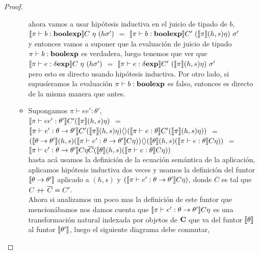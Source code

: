 \begin{proof}
\begin{itemize}
\begin{itemize}
ahora vamos a usar hip\'otesis inductiva en el juicio de tipado de $b$,\\

$\semBrcks{ \pi \vdash b : \boolexp}C \ \eta \ (h\sigma')$ $=$
$\semBrcks{ \pi \vdash b : \boolexp}C' \ (\semBrcks{\pi}(h,s)\eta) \ \sigma'$\\

y entonces vamos a suponer que la evaluaci\'on de juicio de tipado
$\pi \vdash b : \textbf{boolexp}$ es verdadera, luego tenemos que ver que\\

$\llbracket  \pi \vdash e : \delta \textbf{exp} \rrbracket C \ \eta \ (h\sigma')$ $=$ 
$\semBrcks{ \pi \vdash e : \deltaexp}C' \ (\semBrcks{\pi}(h,s)\eta) \ \sigma'$\\

pero esto es directo usando hip\'otesis inductiva. Por otro lado, si supus\'ieramos
la evaluaci\'on $\pi \vdash b : \textbf{boolexp}$ es falso, entonces es directo de la misma
manera que antes.

\item Supongamos $\pi \vdash ee' : \theta'$, \\

$\llbracket \pi \vdash ee' : \theta' \rrbracket C'(\llbracket \pi \rrbracket(h,s)\eta)$ $=$\\
$\llbracket \pi \vdash e' : \theta \rightarrow \theta' \rrbracket C'
		(\llbracket \pi \rrbracket(h,s)\eta)\langle  \rangle
		(\llbracket \pi \vdash e : \theta \rrbracket C'(\llbracket \pi \rrbracket(h,s)\eta))$ $=$\\
$(\llbracket \theta \rightarrow \theta' \rrbracket(h,s)
	(\llbracket \pi \vdash e' : \theta \rightarrow \theta' \rrbracket C \eta))\langle  \rangle
	(\llbracket \theta \rrbracket(h,s)(\llbracket \pi \vdash e : \theta \rrbracket C\eta))$ $=$\\
$\llbracket \pi \vdash e' : \theta \rightarrow \theta' \rrbracket C \eta \overline{C}
	(\llbracket \theta \rrbracket(h,s)(\llbracket \pi \vdash e : \theta \rrbracket C\eta))$\\

hasta ac\'a usamos la definici\'on de la ecuaci\'on sem\'antica de la aplicaci\'on,
aplicamos hip\'otesis inductiva dos veces y usamos la definici\'on del funtor
$\llbracket \theta \rightarrow \theta' \rrbracket$ aplicado a $(h,s)$ y 
$(\llbracket \pi \vdash e' : \theta \rightarrow \theta' \rrbracket C \eta)$, donde 
$\overline{C}$ es tal que $C +\kern-1.3ex+\kern0.8ex \overline{C} = C'$.\\
Ahora si analizamos un poco mas la definici\'on de este funtor que mencion\'abamos
nos damos cuenta que $\llbracket \pi \vdash e' : \theta \rightarrow \theta' \rrbracket C \eta$
es una transformaci\'on natural indexada por objetos de $\textbf{C}$ que va del funtor
$\llbracket \theta \rrbracket$ al funtor $\llbracket \theta' \rrbracket$, luego el siguiente diagrama
debe conmutar,


\end{itemize}
\end{itemize}
\end{proof}
